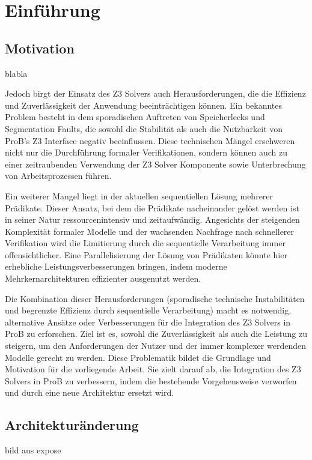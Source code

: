 


\section{Einführung}



\subsection{Motivation}

blabla

Jedoch birgt der Einsatz des Z3 Solvers auch Herausforderungen, die die Effizienz und Zuverlässigkeit der Anwendung beeinträchtigen können.
Ein bekanntes Problem besteht in dem sporadischen Auftreten von Speicherlecks und Segmentation Faults,
die sowohl die Stabilität als auch die Nutzbarkeit von ProB's Z3 Interface negativ beeinflussen.
Diese technischen Mängel erschweren nicht nur die Durchführung formaler Verifikationen,
sondern können auch zu einer zeitraubenden Verwendung der Z3 Solver Komponente sowie Unterbrechung von Arbeitsprozessen führen.

Ein weiterer Mangel liegt in der aktuellen sequentiellen Lösung mehrerer Prädikate.
Dieser Ansatz, bei dem die Prädikate nacheinander gelöst werden
ist in seiner Natur ressourcenintensiv und zeitaufwändig.
Angesichts der steigenden Komplexität formaler Modelle und der wachsenden Nachfrage nach schnellerer Verifikation wird die Limitierung durch die sequentielle Verarbeitung immer offensichtlicher.
Eine Parallelisierung der Lösung von Prädikaten könnte hier erhebliche Leistungsverbesserungen bringen,
indem moderne Mehrkernarchitekturen effizienter ausgenutzt werden.

Die Kombination dieser Herausforderungen (sporadische technische Instabilitäten und begrenzte Effizienz durch sequentielle Verarbeitung) macht es notwendig,
alternative Ansätze oder Verbesserungen für die Integration des Z3 Solvers in ProB zu erforschen.
Ziel ist es, sowohl die Zuverlässigkeit als auch die Leistung zu steigern,
um den Anforderungen der Nutzer und der immer komplexer werdenden Modelle gerecht zu werden.
Diese Problematik bildet die Grundlage und Motivation für die vorliegende Arbeit.
Sie zielt darauf ab, die Integration des Z3 Solvers in ProB zu verbessern,
indem die bestehende Vorgehensweise verworfen und durch eine neue Architektur ersetzt wird.


\subsection{Architekturänderung}

bild aus expose
